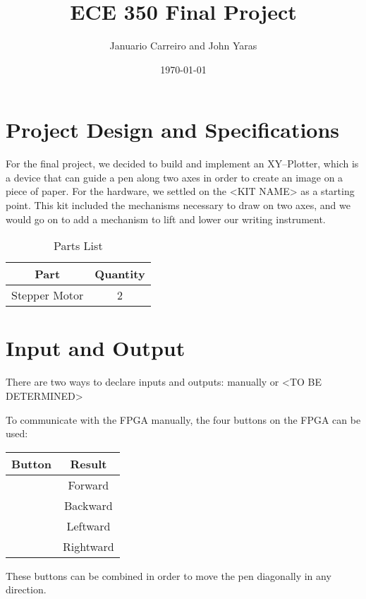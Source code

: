 \documentclass[12pt]{article}
\begin{document}
\title{ECE 350 Final Project}
\author{Januario Carreiro and John Yaras}
\date{\today}

\maketitle

\thispagestyle{fancy}

\newpage

\section{Project Design and Specifications}
For the final project, we decided to build and implement an XY--Plotter, which is a device that can guide a pen along two axes in order to create an image on a piece of paper. For the hardware, we settled on the <KIT NAME> as a starting point. This kit included the mechanisms necessary to draw on two axes, and we would go on to add a mechanism to lift and lower our writing instrument.

\begin{table}[ht!]
\centering
\begin{tabular}{|c|c|} \hline
Part & Quantity \\ \hline \hline
Stepper Motor & 2 \\ \hline
\end{tabular}
\caption{Parts List}
\end{table}


\section{Input and Output}
There are two ways to declare inputs and outputs: manually or <TO BE DETERMINED> %

To communicate with the FPGA manually, the four buttons on the FPGA can be used:

\begin{table}[ht!]
\centering
\begin{tabular}{|c|c|} \hline
Button & Result \\ \hline \hline
 & Forward \\ \hline
 & Backward \\ \hline
 & Leftward \\ \hline
 & Rightward \\ \hline
\end{tabular}
\end{table}

These buttons can be combined in order to move the pen diagonally in any direction.
\end{document}
